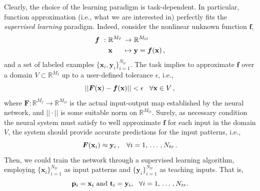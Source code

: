 \documentclass[12pt, a4paper, twoside, openright]{report}
\numberwithin{equation}{chapter}
\theoremstyle{theorem}
\theoremstyle{definition}
\theoremstyle{remark}
\theoremstyle{proposition}
\numberwithin{figure}{chapter}
\begin{document}
		Clearly, the choice of the learning paradigm is task-dependent. In particular, function approximation (i.e., what we are interested in) perfectly fits the \emph{supervised learning} paradigm. Indeed, consider the nonlinear unknown function $\boldsymbol{f}$,
		\begin{equation*}
			\begin{aligned}
				\boldsymbol{f} ~ : ~ & \mathbb{R}^{M_I} \hspace*{-0.3cm} && \rightarrow \mathbb{R}^{M_O} \\
								   & \mathbf{x} && \mapsto \mathbf{y} = \boldsymbol{f}(\mathbf{x}) \, ,
			\end{aligned}
		\end{equation*}
		and a set of labeled examples $\big\lbrace \mathbf{x}_i, \mathbf{y}_i \big\rbrace_{i = 1}^{N_{tr}}$. The task implies to approximate $\boldsymbol{f}$ over a domain $V \subset \mathbb{R}^{M_I}$ up to a user-defined tolerance $\epsilon$, i.e.,
		\begin{equation*}
			||\boldsymbol{F}(\mathbf{x}) - \boldsymbol{f}(\mathbf{x})|| < \epsilon \hspace*{0.3cm} \text{$\forall \mathbf{x} \in V$} \, ,
		\end{equation*}
		where $\mathbf{F} : \mathbb{R}^{M_I} \rightarrow \mathbb{R}^{M_O}$ is the actual input-output map established by the neural network, and $||\cdot||$ is some suitable norm on $\mathbb{R}^{M_O}$. Surely, as necessary condition the neural system must satisfy to well approximate $\mathbf{f}$ for each input in the domain $V$, the system should provide accurate predictions for the input patterns, i.e., 
		\begin{equation*}
			\boldsymbol{F}(\mathbf{x}_i) \approx \mathbf{y}_i \, , \hspace*{0.3cm} \text{$\forall i = 1, \, \ldots \, , N_{tr}$} \, .
		\end{equation*} 
		Then, we could train the network through a supervised learning algorithm, employing $\big\lbrace \mathbf{x}_i \big\rbrace_{i = 1}^{N_{tr}}$ as input patterns and $\big\lbrace \mathbf{y}_i \big\rbrace_{i = 1}^{N_{tr}}$ as teaching inputs. That is, 
		\begin{equation*}
			\text{$\mathbf{p}_i = \mathbf{x}_i$ and $\mathbf{t}_i = \mathbf{y}_i$,} \hspace*{0.3cm} \text{$\forall i = 1, \, \ldots \, , N_{tr}$.}
		\end{equation*}
		
\end{document}

